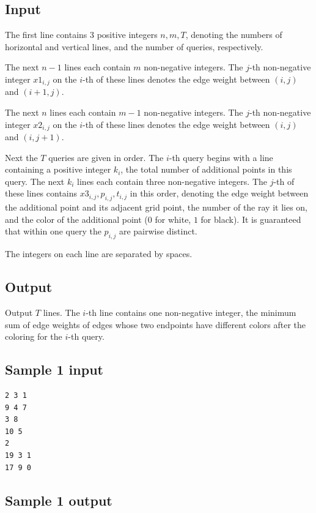 \documentclass[11pt]{article}
\begin{document}
\subsection*{Input}

The first line contains 3 positive integers $n, m, T$, denoting the
numbers of horizontal and vertical lines, and the number of queries,
respectively.

The next $n - 1$ lines each contain $m$ non-negative integers.
The $j$-th non-negative integer $x1_{i,j}$ on the $i$-th of these lines
denotes the edge weight between $(i, j)$ and $(i + 1, j)$.

The next $n$ lines each contain $m - 1$ non-negative integers.
The $j$-th non-negative integer $x2_{i,j}$ on the $i$-th of these lines
denotes the edge weight between $(i, j)$ and $(i, j + 1)$.

Next the $T$ queries are given in order.
The $i$-th query begins with a line containing a positive integer $k_i$,
the total number of additional points in this query.
The next $k_i$ lines each contain three non-negative integers.
The $j$-th of these lines contains $x3_{i,j}, p_{i,j}, t_{i,j}$ in this
order, denoting the edge weight between the additional point and its
adjacent grid point, the number of the ray it lies on, and the color of
the additional point ($0$ for white, $1$ for black).
It is guaranteed that within one query the $p_{i,j}$ are pairwise
distinct.

The integers on each line are separated by spaces.

\subsection*{Output}

Output $T$ lines.
The $i$-th line contains one non-negative integer, the minimum sum of
edge weights of edges whose two endpoints have different colors after the
coloring for the $i$-th query.

\subsection*{Sample 1 input}

\begin{verbatim}
2 3 1
9 4 7
3 8
10 5
2
19 3 1
17 9 0
\end{verbatim}

\subsection*{Sample 1 output}
\end{document}
